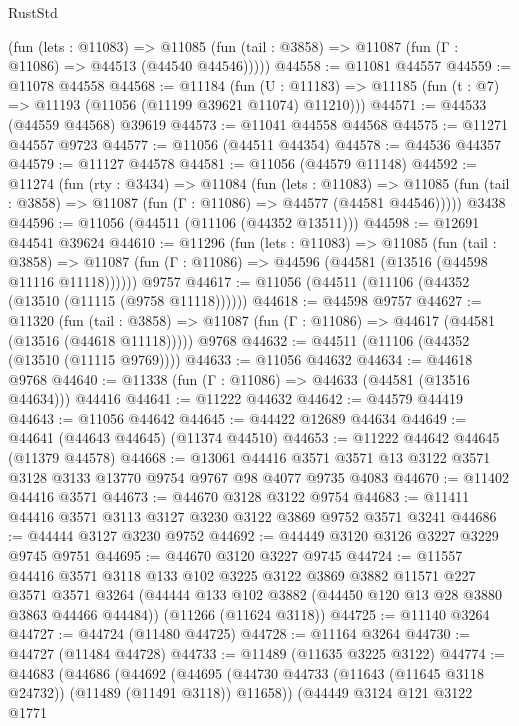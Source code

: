 \begin{lexlean}{RustStd}
\begin{coremodule}
      (fun (lets : @11083) =>
      @11085 (fun (tail : @3858) => @11087 (fun (Γ : @11086) => @44513 (@44540 @44546)))))
@44558 := @11081 @44557
@44559 := @11078 @44558
@44568 := @11184
    (fun (U : @11183) => @11185 (fun (t : @7) => @11193 (@11056 (@11199 @39621 @11074) @11210)))
@44571 := @44533 (@44559 @44568) @39619
@44573 := @11041 @44558 @44568
@44575 := @11271 @44557 @9723
@44577 := @11056 (@44511 @44354)
@44578 := @44536 @44357
@44579 := @11127 @44578
@44581 := @11056 (@44579 @11148)
@44592 := @11274
    (fun (rty : @3434) =>
    @11084
      (fun (lets : @11083) =>
      @11085 (fun (tail : @3858) => @11087 (fun (Γ : @11086) => @44577 (@44581 @44546)))))
    @3438
@44596 := @11056 (@44511 (@11106 (@44352 @13511)))
@44598 := @12691 @44541 @39624
@44610 := @11296
    (fun (lets : @11083) =>
    @11085
      (fun (tail : @3858) =>
      @11087 (fun (Γ : @11086) => @44596 (@44581 (@13516 (@44598 @11116 @11118))))))
    @9757
@44617 := @11056 (@44511 (@11106 (@44352 (@13510 (@11115 (@9758 @11118))))))
@44618 := @44598 @9757
@44627 := @11320
    (fun (tail : @3858) => @11087 (fun (Γ : @11086) => @44617 (@44581 (@13516 (@44618 @11118)))))
    @9768
@44632 := @44511 (@11106 (@44352 (@13510 (@11115 @9769))))
@44633 := @11056 @44632
@44634 := @44618 @9768
@44640 := @11338 (fun (Γ : @11086) => @44633 (@44581 (@13516 @44634))) @44416
@44641 := @11222 @44632
@44642 := @44579 @44419
@44643 := @11056 @44642
@44645 := @44422 @12689 @44634
@44649 := @44641 (@44643 @44645) (@11374 @44510)
@44653 := @11222 @44642 @44645 (@11379 @44578)
@44668 := @13061
    @44416
    @3571
    @3571
    @13
    @3122
    @3571
    @3128
    @3133
    @13770
    @9754
    @9767
    @98
    @4077
    @9735
    @4083
@44670 := @11402 @44416 @3571
@44673 := @44670 @3128 @3122 @9754
@44683 := @11411 @44416 @3571 @3113 @3127 @3230 @3122 @3869 @9752 @3571 @3241
@44686 := @44444 @3127 @3230 @9752
@44692 := @44449 @3120 @3126 @3227 @3229 @9745 @9751
@44695 := @44670 @3120 @3227 @9745
@44724 := @11557
    @44416
    @3571
    @3118
    @133
    @102
    @3225
    @3122
    @3869
    @3882
    @11571
    @227
    @3571
    @3571
    @3264
    (@44444 @133 @102 @3882 (@44450 @120 @13 @28 @3880 @3863 @44466 @44484))
    (@11266 (@11624 @3118))
@44725 := @11140 @3264
@44727 := @44724 (@11480 @44725)
@44728 := @11164 @3264
@44730 := @44727 (@11484 @44728)
@44733 := @11489 (@11635 @3225 @3122)
@44774 := @44683
    (@44686
      (@44692
        (@44695 (@44730 @44733 (@11643 (@11645 @3118 @24732)) (@11489 (@11491 @3118)) @11658))
        (@44449
          @3124
          @121
          @3122
          @1771

\end{coremodule}
\end{lexlean}
